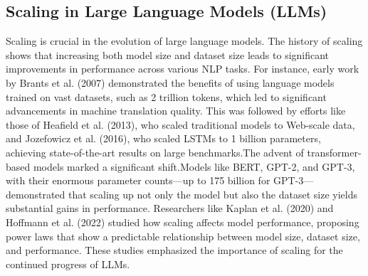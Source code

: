 \subsection{Scaling in Large Language Models (LLMs)}
Scaling is crucial in the evolution of large language models. The history of scaling shows that increasing both model size and dataset size leads to significant improvements in performance across various NLP tasks. For instance, early work by Brants et al. (2007) demonstrated the benefits of using language models trained on vast datasets, such as 2 trillion tokens, which led to significant advancements in machine translation quality. This was followed by efforts like those of Heafield et al. (2013), who scaled traditional models to Web-scale data, and Jozefowicz et al. (2016), who scaled LSTMs to 1 billion parameters, achieving state-of-the-art results on large benchmarks.The advent of transformer-based models marked a significant shift.Models like BERT, GPT-2, and GPT-3, with their enormous parameter counts—up to 175 billion for GPT-3—demonstrated that scaling up not only the model but also the dataset size yields substantial gains in performance. Researchers like Kaplan et al. (2020) and Hoffmann et al. (2022) studied how scaling affects model performance, proposing power laws that show a predictable relationship between model size, dataset size, and performance. These studies emphasized the importance of scaling for the continued progress of LLMs\cite{touvron2023llama}.
